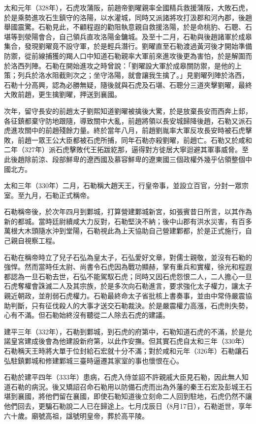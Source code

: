 太和元年（328年），石虎攻蒲阪，前趙帝劉曜親率全國精兵救援蒲阪，大敗石虎，於是乘勢進攻石生鎮守的洛陽，以水灌城，同時又派諸將攻打汲郡和河內郡，後趙舉國震驚。石勒見此，不顧程遐的勸阻執意親自救援洛陽，於是命桃豹、石聰、石堪等到滎陽會合，自己領兵直攻洛陽金鏞城。及至十二月，石勒與後趙諸軍於成皋集合，發現劉曜竟不設守軍，於是輕兵潛行。劉曜直至石勒渡過黃河後才開始準備防禦，從前線捕獲的羯人口中知道石勒親率大軍前來進攻後更為害怕，於是解圍而於洛西列陣。石勒在開始進攻之時曾說：「劉曜設大軍於成皋關防禦，是他的上策；列兵於洛水阻截則次之；坐守洛陽，就會讓我生擒了。」見劉曜列陣於洛西，石勒十分高興，認為必勝無疑，隨後就與石虎及石堪、石聰分三道夾擊劉曜，最終大敗前趙，更生擒劉曜，押送到襄國。

次年，留守長安的前趙太子劉熙知道劉曜被擒後大驚，於是放棄長安而西奔上邽，各征鎮都棄守防地跟隨，導致關中大亂，前趙將領以長安城歸降後趙，石勒又派石虎進攻關中的前趙殘餘力量。終於當年八月，前趙劉胤率大軍反攻長安時被石虎擊敗，前趙一眾王公大臣都被石虎所捕，同年石勒亦殺劉曜，前趙亡。石勒又於咸和二年（327年）派石虎擊敗代王拓跋紇那，逼得對方徙居大寧迴避其軍事威脅。至此後趙除前涼、段部鮮卑的遼西國及慕容鮮卑的遼東國三個政權外幾乎佔領整個中國北方。

太和三年（330年）二月，石勒稱大趙天王，行皇帝事，並設立百官，分封一眾宗室。至九月，石勒正式稱帝。

石勒稱帝後，於次年四月到鄴城，打算營建鄴城新宮，如張賓昔日所言，以其作為新的都城。當時廷尉續咸大力反對，石勒堅決不納；後中山郡有洪水災害，有百多萬根大木頭隨水沖到堂陽，石勒視此為上天協助自己營建鄴都，於是正式施行，自己親自視察工程。

石勒在稱帝時立了兒子石弘為皇太子，石弘愛好文章，對儒士親敬，並沒有石勒的強悍。然而當時任太尉、尚書令石虎因為戰功顯赫，掌有重兵和實權，徐光和程遐都認為一旦石勒去世，石弘不能駕馭石虎；同時又因石虎怨恨二人，二人擔心一旦石虎奪權會誅滅二人及其宗族，於是多次向石勒進言，要求強化太子權力，讓太子親近朝政，並削弱石虎權力。石勒最終命太子省批核上書奏事，並由中常侍嚴震協助判斷，只有征伐殺人的大事才送交石勒裁決。於是嚴震權力高漲，石虎則失勢，心有不滿。但石勒始終沒有聽從二人除去石虎的建議。

建平三年（332年），石勒到鄴城，到石虎的府第中，石勒知道石虎的不滿，於是允諾皇宮建成後會為他建設新府第，以此作安撫。但其實石虎自太和三年（330年）石勒稱天王時將大單于位封給石宏就十分不滿；對於咸和元年（326年）石勒讓石弘駐鎮鄴城和修建鄴城三臺時逼遷其家室的事也懷恨在心。

石勒於建平四年（333年）患病，石虎入侍並詔不許親戚大臣見石勒，因此無人知道石勒的病況。後又矯詔召命石勒用以防備石虎而出為外藩的秦王石宏及彭城王石堪到襄國，將他們留在襄國，即使石勒知道後立刻命二人回到駐地，石虎仍然不讓他們回去，更騙石勒說二人已在歸途上。七月戊辰日（8月17日），石勒逝世，享年六十歲。廟號高祖，諡號明皇帝，葬於高平陵。

